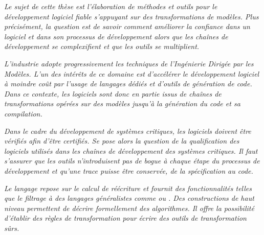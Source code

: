 \cleardoublepage
{}
{}
\label{ch:introduction}



\textit{Le sujet de cette thèse est l'élaboration de méthodes et outils pour le
développement logiciel fiable s'appuyant sur des transformations de modèles.
Plus précisément, la question est de savoir comment améliorer la confiance dans
un logiciel et dans son processus de développement alors que les chaînes de
développement se complexifient et que les outils se multiplient.}

\textit{L'industrie adopte progressivement les techniques de l'Ingénierie Dirigée par
les Modèles. L'un des intérêts de ce domaine est d'accélérer le développement
logiciel à moindre coût par l'usage de langages dédiés et d'outils de
génération de code. Dans ce contexte, les logiciels sont donc en partie issus
de chaînes de transformations opérées sur des modèles jusqu'à la génération du
code et sa compilation.}
  
\textit{Dans le cadre du développement de systèmes critiques, les logiciels doivent
être vérifiés afin d'être certifiés. Se pose alors la question de la
qualification des logiciels utilisés dans les chaînes de développement des
systèmes critiques. Il faut s'assurer que les outils n'introduisent pas de
bogue à chaque étape du processus de développement et qu'une trace puisse être
conservée, de la spécification au code.}


\textit{Le langage {\tom} repose sur le calcul de réécriture et fournit des
fonctionnalités telles que le filtrage à des langages généralistes comme
{\java} ou {\ada}. Des constructions de haut niveau permettent de décrire
formellement des algorithmes. Il offre la possibilité d'établir des règles de
transformation pour écrire des outils de transformation sûrs.}

